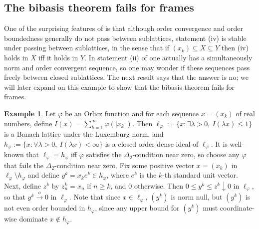 \documentclass[12pt,leqno]{amsart}
\numberwithin{equation}{section}
\theoremstyle{definition}
\newtheorem{example}[theorem]{Example}
\begin{document}
\subsection{The bibasis theorem fails for frames}\label{frame subsec}
One of the surprising features of  is that although order convergence and order boundedness generally do not pass between sublattices, statement (iv) is stable under passing between sublattices, in the sense that if $(x_k)\subseteq X\subseteq Y$ then (iv) holds in $X$ iff it holds in $Y$. In statement (ii) of  one actually has a simultaneously norm and order convergent sequence, so one may wonder if these sequences pass freely between closed sublattices. The next result says that the answer is no; we will later expand on this example to show that the bibasis theorem fails for frames.
\begin{example}\label{no pass}
Let $\varphi$ be an Orlicz function and for each sequence $x=(x_k)$ of real numbers, define  $I(x)=\sum_{k=1}^\infty \varphi (|x_k|)$. Then $\ell_{\varphi}:=\{x : \exists \lambda>0, \  I(\lambda x)\leq 1\}$ is a Banach lattice under the Luxemburg norm, and $h_{\varphi}:=\{x : \forall \lambda>0, \ I(\lambda x)<\infty\}$ is a closed order dense ideal of $\ell_\varphi$. It is well-known that $\ell_\varphi=h_\varphi$ iff $\varphi$ satisfies the $\Delta_2$-condition near zero, so choose any $\varphi$ that fails the $\Delta_2$-condition near zero. Fix some positive vector $x=(x_k)$ in $\ell_\varphi \setminus h_\varphi$ and define $y^k=x_ke^k\in h_\varphi$, where $e^k$ is the $k$-th standard unit vector. Next, define $z^k$ by $z^k_n=x_n$ if $n\geq k$, and $0$ otherwise. Then $0\leq y^k\leq z^k\downarrow 0$ in $\ell_{\varphi}$, so that $y^k\xrightarrow{o}0$ in $\ell_{\varphi}$. Note that since $x\in \ell_{\varphi}$, $(y^k)$ is norm null, but $(y^k)$ is not even order bounded in $h_\varphi$, since any upper bound for $(y^k)$ must coordinate-wise dominate $x\not \in h_\varphi$.

\end{example}
\end{document}
